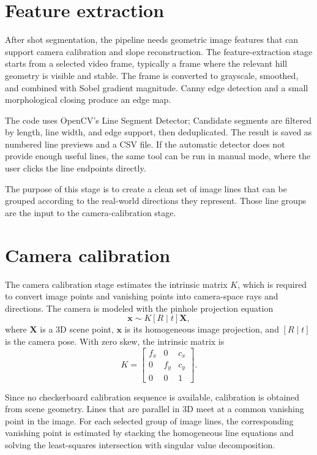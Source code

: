 \section{Feature extraction}
After shot segmentation, the pipeline needs geometric image features that can support camera calibration and slope reconstruction. The feature-extraction stage starts from a selected video frame, typically a frame where the relevant hill geometry is visible and stable. The frame is converted to grayscale, smoothed, and combined with Sobel gradient magnitude. Canny edge detection and a small morphological closing produce an edge map.

The code uses OpenCV's Line Segment Detector; Candidate segments are filtered by length, line width, and edge support, then deduplicated. The result is saved as numbered line previews and a CSV file. If the automatic detector does not provide enough useful lines, the same tool can be run in manual mode, where the user clicks the line endpoints directly.

The purpose of this stage is to create a clean set of image lines that can be grouped according to the real-world directions they represent. Those line groups are the input to the camera-calibration stage.

\section{Camera calibration}
The camera calibration stage estimates the intrinsic matrix \(K\), which is required to convert image points and vanishing points into camera-space rays and directions. The camera is modeled with the pinhole projection equation
\[
\mathbf{x} \sim K [R \mid t] \mathbf{X},
\]
where \(\mathbf{X}\) is a 3D scene point, \(\mathbf{x}\) is its homogeneous image projection, and \([R \mid t]\) is the camera pose. With zero skew, the intrinsic matrix is
\[
K =
\begin{bmatrix}
f_x & 0 & c_x \\
0 & f_y & c_y \\
0 & 0 & 1
\end{bmatrix}.
\]

Since no checkerboard calibration sequence is available, calibration is obtained from scene geometry. Lines that are parallel in 3D meet at a common vanishing point in the image. For each selected group of image lines, the corresponding vanishing point is estimated by stacking the homogeneous line equations and solving the least-squares intersection with singular value decomposition.

